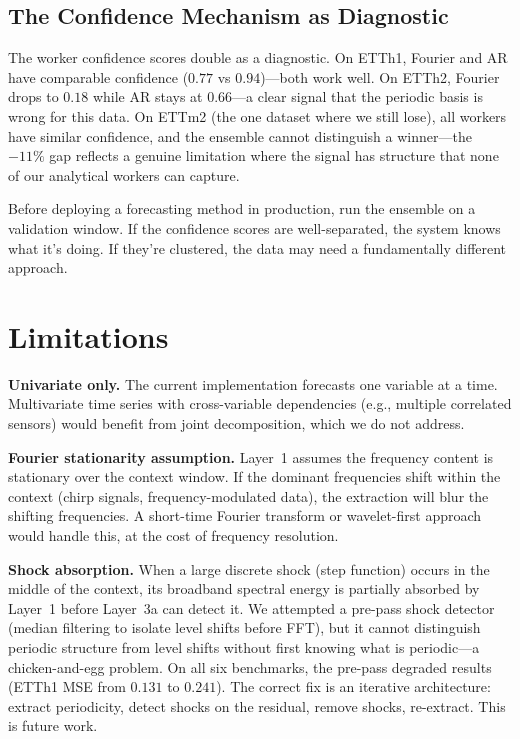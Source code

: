 \documentclass[sigconf,nonacm]{acmart}
\begin{document}
\subsection{The Confidence Mechanism as Diagnostic}

The worker confidence scores double as a diagnostic. On ETTh1, Fourier and AR have comparable confidence ($0.77$ vs $0.94$)---both work well. On ETTh2, Fourier drops to $0.18$ while AR stays at $0.66$---a clear signal that the periodic basis is wrong for this data. On ETTm2 (the one dataset where we still lose), all workers have similar confidence, and the ensemble cannot distinguish a winner---the $-11\%$ gap reflects a genuine limitation where the signal has structure that none of our analytical workers can capture.

Before deploying a forecasting method in production, run the ensemble on a validation window. If the confidence scores are well-separated, the system knows what it's doing. If they're clustered, the data may need a fundamentally different approach.

\section{Limitations}

\textbf{Univariate only.} The current implementation forecasts one variable at a time. Multivariate time series with cross-variable dependencies (e.g., multiple correlated sensors) would benefit from joint decomposition, which we do not address.

\textbf{Fourier stationarity assumption.} Layer~1 assumes the frequency content is stationary over the context window. If the dominant frequencies shift within the context (chirp signals, frequency-modulated data), the extraction will blur the shifting frequencies. A short-time Fourier transform or wavelet-first approach would handle this, at the cost of frequency resolution.

\textbf{Shock absorption.} When a large discrete shock (step function) occurs in the middle of the context, its broadband spectral energy is partially absorbed by Layer~1 before Layer~3a can detect it. We attempted a pre-pass shock detector (median filtering to isolate level shifts before FFT), but it cannot distinguish periodic structure from level shifts without first knowing what is periodic---a chicken-and-egg problem. On all six benchmarks, the pre-pass degraded results (ETTh1 MSE from $0.131$ to $0.241$). The correct fix is an iterative architecture: extract periodicity, detect shocks on the residual, remove shocks, re-extract. This is future work.
\end{document}

